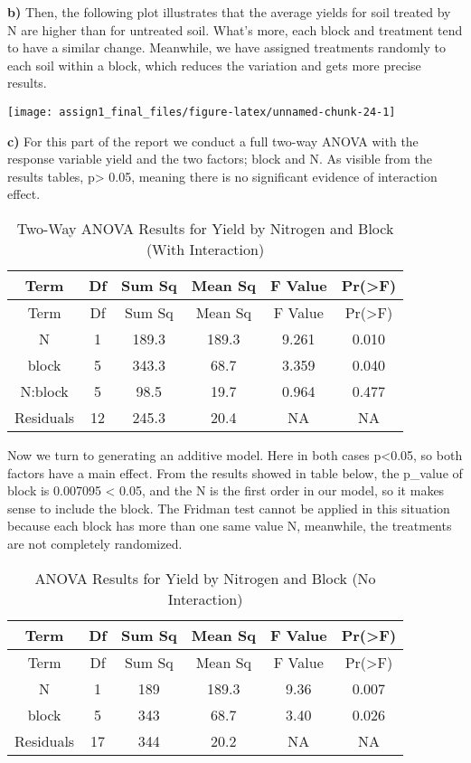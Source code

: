 \documentclass[
]{article}
\begin{document}
\textbf{b)} Then, the following plot illustrates that the average yields
for soil treated by N are higher than for untreated soil. What's more,
each block and treatment tend to have a similar change. Meanwhile, we
have assigned treatments randomly to each soil within a block, which
reduces the variation and gets more precise results.

\begin{center}\texttt{[image: assign1\_final\_files/figure-latex/unnamed-chunk-24-1]} \end{center}

\textbf{c)} For this part of the report we conduct a full two-way ANOVA
with the response variable yield and the two factors; block and N. As
visible from the results tables, p\textgreater{} 0.05, meaning there is
no significant evidence of interaction effect.

\begin{longtable}[]{@{}cccccc@{}}
\caption{Two-Way ANOVA Results for Yield by Nitrogen and Block (With
Interaction)}\tabularnewline
\toprule\noalign{}
Term & Df & Sum Sq & Mean Sq & F Value & Pr(\textgreater F) \\
\midrule\noalign{}
\endfirsthead
\toprule\noalign{}
Term & Df & Sum Sq & Mean Sq & F Value & Pr(\textgreater F) \\
\midrule\noalign{}
\endhead
\bottomrule\noalign{}
\endlastfoot
N & 1 & 189.3 & 189.3 & 9.261 & 0.010 \\
block & 5 & 343.3 & 68.7 & 3.359 & 0.040 \\
N:block & 5 & 98.5 & 19.7 & 0.964 & 0.477 \\
Residuals & 12 & 245.3 & 20.4 & NA & NA \\
\end{longtable}

Now we turn to generating an additive model. Here in both cases
p\textless0.05, so both factors have a main effect. From the results
showed in table below, the p\_value of block is 0.007095 \textless{}
0.05, and the N is the first order in our model, so it makes sense to
include the block. The Fridman test cannot be applied in this situation
because each block has more than one same value N, meanwhile, the
treatments are not completely randomized.

\begin{longtable}[]{@{}cccccc@{}}
\caption{ANOVA Results for Yield by Nitrogen and Block (No
Interaction)}\tabularnewline
\toprule\noalign{}
Term & Df & Sum Sq & Mean Sq & F Value & Pr(\textgreater F) \\
\midrule\noalign{}
\endfirsthead
\toprule\noalign{}
Term & Df & Sum Sq & Mean Sq & F Value & Pr(\textgreater F) \\
\midrule\noalign{}
\endhead
\bottomrule\noalign{}
\endlastfoot
N & 1 & 189 & 189.3 & 9.36 & 0.007 \\
block & 5 & 343 & 68.7 & 3.40 & 0.026 \\
Residuals & 17 & 344 & 20.2 & NA & NA \\
\end{longtable}
\end{document}
